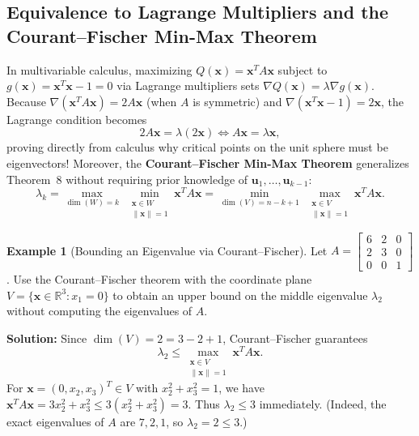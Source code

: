 \documentclass[11pt, letterpaper]{article}
\theoremstyle{definition}
\newtheorem{example}{Example}[section]
\theoremstyle{remark}
\newcommand{\R}{\mathbb{R}}
\begin{document}
\subsection{Equivalence to Lagrange Multipliers and the Courant–Fischer Min-Max Theorem}
In multivariable calculus, maximizing $Q(\mathbf{x}) = \mathbf{x}^T A \mathbf{x}$ subject to $g(\mathbf{x}) = \mathbf{x}^T \mathbf{x} - 1 = 0$ via Lagrange multipliers sets $\nabla Q(\mathbf{x}) = \lambda \nabla g(\mathbf{x})$. Because $\nabla(\mathbf{x}^T A \mathbf{x}) = 2A\mathbf{x}$ (when $A$ is symmetric) and $\nabla(\mathbf{x}^T \mathbf{x} - 1) = 2\mathbf{x}$, the Lagrange condition becomes
\[
2A\mathbf{x} = \lambda (2\mathbf{x}) \iff A\mathbf{x} = \lambda \mathbf{x},
\]
proving directly from calculus why critical points on the unit sphere must be eigenvectors! Moreover, the \textbf{Courant–Fischer Min-Max Theorem} generalizes Theorem~8 without requiring prior knowledge of $\mathbf{u}_1, \dots, \mathbf{u}_{k-1}$:
\[
\lambda_k = \max_{\dim(W)=k} \; \min_{\substack{\mathbf{x} \in W \\ \|\mathbf{x}\| = 1}} \mathbf{x}^T A \mathbf{x} = \min_{\dim(V)=n-k+1} \; \max_{\substack{\mathbf{x} \in V \\ \|\mathbf{x}\| = 1}} \mathbf{x}^T A \mathbf{x}.
\]

\begin{example}[Bounding an Eigenvalue via Courant–Fischer]
Let $A = \begin{bmatrix} 6 & 2 & 0 \\ 2 & 3 & 0 \\ 0 & 0 & 1 \end{bmatrix}$. Use the Courant–Fischer theorem with the coordinate plane $V = \{\mathbf{x} \in \R^3 : x_1 = 0\}$ to obtain an upper bound on the middle eigenvalue $\lambda_2$ without computing the eigenvalues of $A$.

\textbf{Solution:} Since $\dim(V) = 2 = 3 - 2 + 1$, Courant–Fischer guarantees
\[
\lambda_2 \le \max_{\substack{\mathbf{x} \in V \\ \|\mathbf{x}\| = 1}} \mathbf{x}^T A \mathbf{x}.
\]
For $\mathbf{x} = (0, x_2, x_3)^T \in V$ with $x_2^2 + x_3^2 = 1$, we have $\mathbf{x}^T A \mathbf{x} = 3x_2^2 + x_3^2 \le 3(x_2^2 + x_3^2) = 3$. Thus $\lambda_2 \le 3$ immediately. (Indeed, the exact eigenvalues of $A$ are $7, 2, 1$, so $\lambda_2 = 2 \le 3$.)
\end{example}

\end{document}

